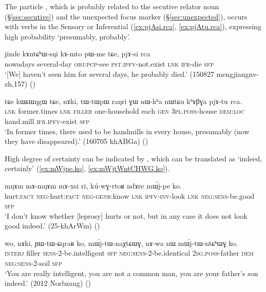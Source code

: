  
 The particle , which is probably related to the secutive relator noun  (§\ref{sec:secutive}) and the unexpected focus marker  (§\ref{sec:unexpected}), occurs with verbs in the Sensory or Inferential (\ref{ex:pjAsi.rca}, \ref{ex:pjAtu.rca}), expressing high probability `presumably, probably'.
 
\begin{exe} 
\ex \label{ex:pjAsi.rca}
\gll jinde kɤntɕʰɯ-sŋi kɤ-mto pɯ-me tɕe, pjɤ-si rca \\
nowadays several-day \textsc{obj}:\textsc{pcp}-see \textsc{pst}.\textsc{ipfv}-not.exist \textsc{lnk} \textsc{ifr}-die \textsc{sfp} \\
\glt `[We] haven't seen him for several days, he probably died.' (150827 mengjiangnv-zh,157)
()
\end{exe} 

\begin{exe} 
\ex \label{ex:pjAtu.rca}
\gll  tɕe kɯɕɯŋgɯ tɕe, nɤki, tɯ-tɯpɯ raŋri ɣɯ nɯ-kʰa nɯtɕu kʰɤβɣa pjɤ-tu rca. \\
\textsc{lnk} former.times \textsc{lnk} \textsc{filler} one-household each \textsc{gen} \textsc{3pl}.\textsc{poss}-house \textsc{dem}:\textsc{loc} hand.mill \textsc{ifr}.\textsc{ipfv}-exist \textsc{sfp} \\
\glt `In former times, there used to be handmills in every house, presumably (now they have disappeared).' (160705 khABGa)
()
\end{exe} 

High degree of certainty can be indicated by , which can be translated as `indeed, certainly' (\ref{ex:mWjpe.ko}, \ref{ex:mWjtWntCHWG.ko}).
 
\begin{exe} 
\ex \label{ex:mWjpe.ko}
\gll  mŋɤm mɤ-mŋɤm mɤ-xsi ri, kú-wɣ-rtoʁ ndɤre mɯ́j-pe ko. \\
hurt:\textsc{fact} \textsc{neg}-hurt:\textsc{fact} \textsc{neg}-\textsc{genr}:know \textsc{lnk} \textsc{ipfv}-\textsc{inv}-look \textsc{lnk} \textsc{neg}:\textsc{sens}-be.good \textsc{sfp} \\
\glt `I don't know whether [leprosy] hurts or not, but in any case it does not look good indeed.' (25-khArWm) 	()
\end{exe} 

\begin{exe} 
\ex \label{ex:mWjtWntCHWG.ko}
\gll wo, nɤki, ɲɯ-tɯ-ɕqraʁ ko, mɯ́j-tɯ-naχtɕɯɣ, nɤ-wa nɯ mɯ́j-tɯ-ntɕʰɯɣ ko. \\
\textsc{interj} filler \textsc{sens}-2-be.intelligent \textsc{sfp} \textsc{neg}:\textsc{sens}-2-be.identical \textsc{2sg}.\textsc{poss}-father \textsc{dem} \textsc{neg}:\textsc{sens}-2-soil \textsc{sfp} \\ 
\glt  `You are really intelligent, you are not a common man, you are your father's son indeed.' (2012 Norbzang)
()
\end{exe} 

